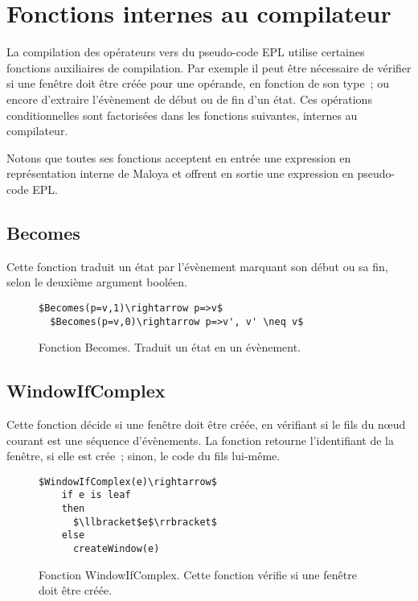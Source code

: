 \section{Fonctions internes au compilateur}
La compilation des opérateurs vers du pseudo-code EPL utilise certaines fonctions auxiliaires de compilation. Par exemple il peut être nécessaire de vérifier si une fenêtre doit être créée pour une opérande, en fonction de son type~; ou encore d'extraire l'évènement de début ou de fin d'un état.  Ces opérations conditionnelles sont factorisées dans les fonctions suivantes, internes au compilateur.

Notons que toutes ses fonctions acceptent en entrée une expression en représentation interne de Maloya et offrent en sortie une expression en pseudo-code EPL.
\subsection*{Becomes}%
Cette fonction traduit un état par l'évènement marquant son début ou sa fin, selon le deuxième argument booléen.
\begin{figure}[!h]
\begin{lstlisting}[frame=bt]
  $Becomes(p=v,1)\rightarrow p=>v$
  $Becomes(p=v,0)\rightarrow p=>v', v' \neq v$
\end{lstlisting}
\caption{Fonction Becomes. Traduit un état en un évènement.}
\label{listing:becomes}
\end{figure}
\subsection*{WindowIfComplex}
Cette fonction décide si une fenêtre doit être créée, en vérifiant si le fils du n{\oe}ud courant est une séquence d'évènements.
La fonction retourne l'identifiant de la fenêtre, si elle est crée~; sinon, le code du fils lui-même.
\begin{figure}[!h]
\begin{lstlisting}[frame=bt]
  $WindowIfComplex(e)\rightarrow$
    if e is leaf
    then
      $\llbracket$e$\rrbracket$
    else
      createWindow(e)
\end{lstlisting}
\caption{Fonction WindowIfComplex. Cette fonction vérifie si une fenêtre doit être créée.}
\label{listing:windoifcomplex}
\end{figure}

